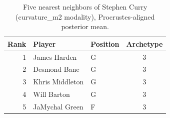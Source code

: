 \begin{table}[htbp]
  \centering\small
  \begin{tabular}{rllc}
    \toprule
    Rank & Player & Position & Archetype \\
    \midrule
    1 & James Harden & G & 3 \\
    2 & Desmond Bane & G & 3 \\
    3 & Khris Middleton & G & 3 \\
    4 & Will Barton & G & 3 \\
    5 & JaMychal Green & F & 3 \\
    \bottomrule
  \end{tabular}
  \caption{Five nearest neighbors of Stephen Curry (curvature_m2 modality), Procrustes-aligned posterior mean.}
  \label{tab:Stephen_Curry_neighbors_curvature_m2}
\end{table}

